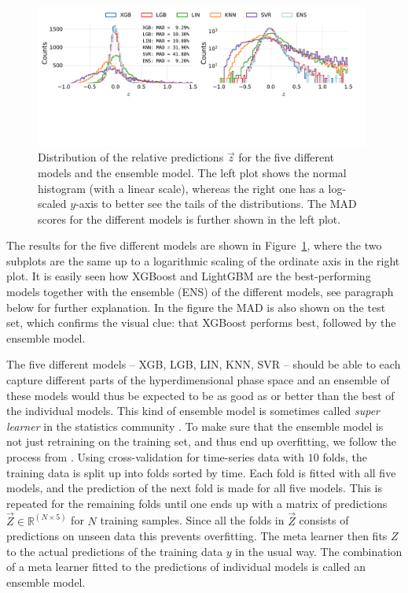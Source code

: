 \begin{figure}[ht!]
  \centerfloat
  \includegraphics[draft=false, width=0.98\textwidth, trim=10 130 40 10, clip]{figures/housing/Ejerlejlighed_v19_cut_all_Ncols_all_all_models.pdf}
  \caption[Performance Comparison of Multiple Models]
          {Distribution of the relative predictions $\vec{z}$ for the five different models and the ensemble model. The left plot shows the normal histogram (with a linear scale), whereas the right one has a log-scaled $y$-axis to better see the tails of the distributions. The MAD scores for the different models is further shown in the left plot.} 
  \label{fig:h:multiple_models}
\end{figure}

The results for the five different models are shown in Figure~\ref{fig:h:multiple_models}, where the two subplots are the same up to a logarithmic scaling of the ordinate axis in the right plot. It is easily seen how XGBoost and LightGBM are the best-performing models together with the ensemble (ENS) of the different models, see paragraph below for further explanation. In the figure the MAD is also shown on the test set, which confirms the visual clue: that XGBoost performs best, followed by the ensemble model.


The five different models -- XGB, LGB, LIN, KNN, SVR -- should be able to each capture different parts of the hyperdimensional phase space and an ensemble of these models would thus be expected to be as good as or better than the best of the individual models. This kind of ensemble model is sometimes called \emph{super learner} in the statistics community \autocite{polleySuperLearnerPrediction2010,vanSuperLearner2007}. To make sure that the ensemble model is not just retraining on the training set, and thus end up overfitting, we follow the process from \citet{polleySuperLearnerPrediction2010}. Using cross-validation for time-series data with $10$ folds, the training data is split up into folds sorted by time. Each fold is fitted with all five models, and the prediction of the next fold is made for all five models. This is repeated for the remaining folds until one ends up with a matrix of predictions $\vec{Z} \in \mathbb{R}^{(N \times 5)}$ for $N$ training samples. Since all the folds in $\vec{Z}$ consists of predictions on unseen data this prevents overfitting. The meta learner then fits $Z$ to the actual predictions of the training data $y$ in the usual way. The combination of a meta learner fitted to the predictions of individual models is called an ensemble model.

